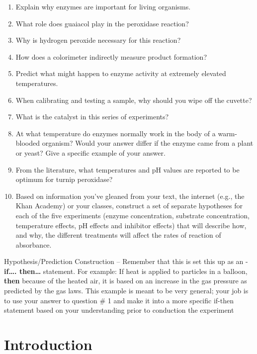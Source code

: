 \documentclass[
  letterpaper,
  DIV=11,
  numbers=noendperiod]{scrreprt}
\begin{document}
\begin{enumerate}
\def\labelenumi{\arabic{enumi}.}
\item
  Explain why enzymes are important for living organisms.
\item
  What role does guaiacol play in the peroxidase reaction?
\item
  Why is hydrogen peroxide necessary for this reaction?
\item
  How does a colorimeter indirectly measure product formation?
\item
  Predict what might happen to enzyme activity at extremely elevated
  temperatures.
\item
  When calibrating and testing a sample, why should you wipe off the
  cuvette?
\item
  What is the catalyst in this series of experiments?
\item
  At what temperature do enzymes normally work in the body of a
  warm-blooded organism? Would your answer differ if the enzyme came
  from a plant or yeast? Give a specific example of your answer.
\item
  From the literature, what temperatures and pH values are reported to
  be optimum for turnip peroxidase?
\item
  Based on information you've gleaned from your text, the internet
  (e.g., the Khan Academy) or your classes, construct a set of separate
  hypotheses for each of the five experiments (enzyme concentration,
  substrate concentration, temperature effects, pH effects and inhibitor
  effects) that will describe how, and why, the different treatments
  will affect the rates of reaction of absorbance.
\end{enumerate}

Hypothesis/Prediction Construction -- Remember that this is set this up
as an - \textbf{if\ldots. then\ldots{}} statement. For example: If heat
is applied to particles in a balloon, \textbf{then} because of the
heated air, it is based on an increase in the gas pressure as predicted
by the gas laws. This example is meant to be very general; your job is
to use your answer to question \# 1 and make it into a more specific
if-then statement based on your understanding prior to conduction the
experiment

\section{\texorpdfstring{\textbf{Introduction}}{Introduction}}\label{introduction-3}
\end{document}
